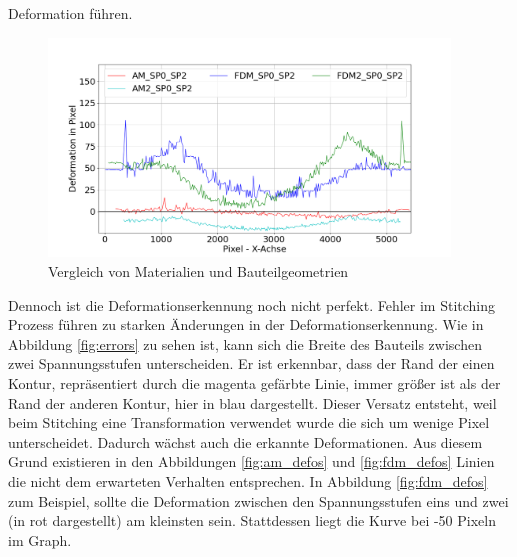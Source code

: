 Deformation führen.

\begin{figure}[H]
  \centering
  \includegraphics[width=0.95\textwidth]{images/compare_materials.png}
  \caption{Vergleich von Materialien und Bauteilgeometrien}
  \label{fig:materials}
\end{figure}

Dennoch ist die Deformationserkennung noch nicht perfekt. 
Fehler im Stitching Prozess führen zu starken Änderungen in der Deformationserkennung. 
Wie in Abbildung \ref{fig:errors} zu sehen ist, kann sich die Breite des Bauteils 
zwischen zwei Spannungsstufen unterscheiden. Er ist erkennbar, dass der Rand der einen 
Kontur, repräsentiert durch die magenta gefärbte Linie, immer größer ist als 
der Rand der anderen Kontur, hier in blau dargestellt.
Dieser Versatz entsteht, weil beim Stitching eine Transformation verwendet wurde die sich 
um wenige Pixel unterscheidet. Dadurch wächst auch die erkannte Deformationen.
Aus diesem Grund existieren in den Abbildungen \ref{fig:am_defos} und \ref{fig:fdm_defos}
Linien die nicht dem erwarteten Verhalten entsprechen. 
In Abbildung \ref{fig:fdm_defos} zum Beispiel, sollte die Deformation zwischen den 
Spannungsstufen eins und zwei 
(in rot dargestellt) am kleinsten sein. Stattdessen liegt die Kurve bei -50 Pixeln im Graph.

